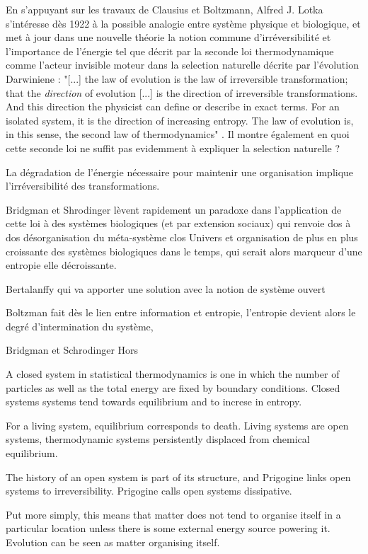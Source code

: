 En s'appuyant sur les travaux de Clausius et Boltzmann, Alfred J. Lotka s'intéresse dès 1922 \autocite{Lotka1922} à la possible analogie entre système physique et biologique, et met à jour dans une nouvelle théorie la notion commune d'irréversibilité et l'importance de l'énergie tel que décrit par la seconde loi thermodynamique comme l'acteur invisible moteur dans la selection naturelle décrite par l'évolution Darwiniene  : "[...] the law of evolution is the law of irreversible transformation; that the \textit{direction} of evolution [...] is the direction of irreversible transformations. And this direction the physicist can define or describe in exact terms. For an isolated system, it is the direction of increasing entropy.  The law of evolution is, in this sense, the second law of thermodynamics" \autocite[26]{Lotka1925}. Il montre également en quoi cette seconde loi ne suffit pas evidemment à expliquer la selection naturelle ?

La dégradation de l'énergie nécessaire pour maintenir une organisation implique l'irréversibilité des transformations.

Bridgman et Shrodinger lèvent rapidement un paradoxe dans l'application de cette loi à des systèmes biologiques (et par extension sociaux) qui renvoie dos à dos désorganisation du méta-système clos Univers et organisation de plus en plus croissante des systèmes biologiques dans le temps, qui serait alors marqueur d'une entropie elle décroissante.

Bertalanffy qui va apporter une solution avec la notion de système ouvert

Boltzman fait dès le lien entre information et entropie, l'entropie devient alors le degré d'intermination du système, 

Bridgman et Schrodinger Hors 

A closed system in statistical thermodynamics is one in which the number of particles as well as the total energy are fixed by boundary conditions. Closed systems systems tend towards equilibrium and to increse in entropy.

For a living system, equilibrium corresponds to death. Living systems are open systems, thermodynamic systems persistently displaced from chemical equilibrium. 

The history of an open system is part of its structure, and Prigogine links open systems to irreversibility. Prigogine calls open systems dissipative. 

Put more simply, this means that matter does not tend to organise itself in a particular location unless there is some external energy source powering it. Evolution can be seen as matter organising itself.

